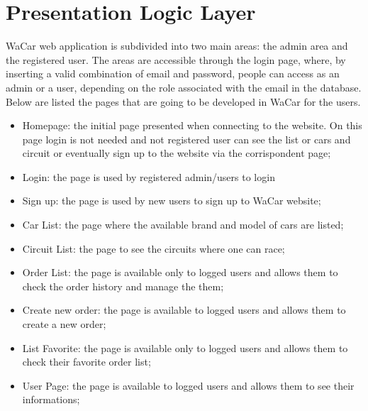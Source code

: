 \section{Presentation Logic Layer}


WaCar web application is subdivided into two main areas: the admin area and the registered user. The areas are accessible through the login page, where, by inserting a valid combination of email and password, people can access as an admin or a user, depending on the role associated with the email in the database. Below are listed the pages that are going to be developed in WaCar for the users.
\begin{itemize}
    \item Homepage: the initial page presented when connecting to the website. On this page login is not needed and not registered user can see the list or cars and circuit or eventually sign up to the website via the corrispondent page;
    \item Login: the page is used by registered admin/users to login
    \item Sign up: the page is used by new users to sign up to WaCar website;
    \item Car List: the page where the available brand and model of cars are listed;
    \item Circuit List: the page to see the circuits where one can race;
    \item Order List: the page is available only to logged users and allows them to check the order history and manage the them;
    \item Create new order: the page is available to logged users and allows them to create a new order;
    \item List Favorite: the page is available only to logged users and allows them to check their favorite order list;
    \item User Page: the page is available to logged users and allows them to see their informations;
\end{itemize}

